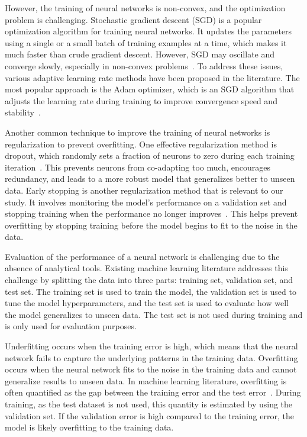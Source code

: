 However, the training of neural networks is non-convex, and the optimization problem is challenging.
Stochastic gradient descent (SGD) is a popular optimization algorithm for training neural networks.
It updates the parameters using a single or a small batch of training examples at a time, which makes it much faster than crude gradient descent.
However, SGD may oscillate and converge slowly, especially in non-convex problems~\citep{bengio2016}.
To address these issues, various adaptive learning rate methods have been proposed in the literature.
The most popular approach is the Adam optimizer, which is an SGD algorithm that adjusts the learning rate during training to improve convergence speed and stability~\citep{kingma2014adam}.

Another common technique to improve the training of neural networks is regularization to prevent overfitting.
One effective regularization method is dropout, which randomly sets a fraction of neurons to zero during each training iteration~\citep{srivastava2014dropout}.
This prevents neurons from co-adapting too much, encourages redundancy, and leads to a more robust model that generalizes better to unseen data.
Early stopping is another regularization method that is relevant to our study.
It involves monitoring the model's performance on a validation set and stopping training when the performance no longer improves~\citep{prechelt2002early}.
This helps prevent overfitting by stopping training before the model begins to fit to the noise in the data.

Evaluation of the performance of a neural network is challenging due to the absence of analytical tools.
Existing machine learning literature addresses this challenge by splitting the data into three parts: training set, validation set, and test set.
The training set is used to train the model, the validation set is used to tune the model hyperparameters, and the test set is used to evaluate how well the model generalizes to unseen data.
The test set is not used during training and is only used for evaluation purposes.

Underfitting occurs when the training error is high, which means that the neural network fails to capture the underlying patterns in the training data.
Overfitting occurs when the neural network fits to the noise in the training data and cannot generalize results to unseen data.
In machine learning literature, overfitting is often quantified as the gap between the training error and the test error~\citep{bishop2006pattern}.
During training, as the test dataset is not used, this quantity is estimated by using the validation set.
If the validation error is high compared to the training error, the model is likely overfitting to the training data.

